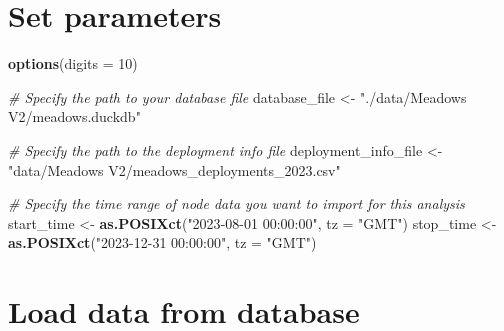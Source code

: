 \documentclass[
]{book}
\newenvironment{Shaded}{\begin{snugshade}}{\end{snugshade}}
\newcommand{\AttributeTok}[1]{\textcolor[rgb]{0.13,0.29,0.53}{#1}}
\newcommand{\CommentTok}[1]{\textcolor[rgb]{0.56,0.35,0.01}{\textit{#1}}}
\newcommand{\DecValTok}[1]{\textcolor[rgb]{0.00,0.00,0.81}{#1}}
\newcommand{\FunctionTok}[1]{\textcolor[rgb]{0.13,0.29,0.53}{\textbf{#1}}}
\newcommand{\NormalTok}[1]{#1}
\newcommand{\OtherTok}[1]{\textcolor[rgb]{0.56,0.35,0.01}{#1}}
\newcommand{\StringTok}[1]{\textcolor[rgb]{0.31,0.60,0.02}{#1}}
\begin{document}
\section{Set parameters}\label{set-parameters}

\begin{Shaded}
\begin{Highlighting}[]
\FunctionTok{options}\NormalTok{(}\AttributeTok{digits =} \DecValTok{10}\NormalTok{)}

\CommentTok{\# Specify the path to your database file}
\NormalTok{database\_file }\OtherTok{\textless{}{-}} \StringTok{"./data/Meadows V2/meadows.duckdb"}

\CommentTok{\# Specify the path to the deployment info file}
\NormalTok{deployment\_info\_file }\OtherTok{\textless{}{-}} \StringTok{"data/Meadows V2/meadows\_deployments\_2023.csv"}

\CommentTok{\# Specify the time range of node data you want to import for this analysis}
\NormalTok{start\_time }\OtherTok{\textless{}{-}} \FunctionTok{as.POSIXct}\NormalTok{(}\StringTok{"2023{-}08{-}01 00:00:00"}\NormalTok{, }\AttributeTok{tz =} \StringTok{"GMT"}\NormalTok{)}
\NormalTok{stop\_time }\OtherTok{\textless{}{-}} \FunctionTok{as.POSIXct}\NormalTok{(}\StringTok{"2023{-}12{-}31 00:00:00"}\NormalTok{, }\AttributeTok{tz =} \StringTok{"GMT"}\NormalTok{)}
\end{Highlighting}
\end{Shaded}

\section{Load data from database}\label{load-data-from-database-1}
\end{document}

